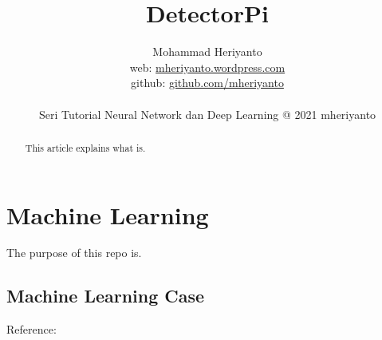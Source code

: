 \documentclass[12pt,oneside,a4paper]{article}
\begin{document}
\title{DetectorPi}
\author{Mohammad Heriyanto \\web: \href{https://mheriyanto.wordpress.com//}{mheriyanto.wordpress.com} \\ github: \href{https://github.com/mheriyanto}{github.com/mheriyanto} \\~\\ Seri Tutorial Neural Network dan Deep Learning @ 2021 mheriyanto}
   
\maketitle

\begin{abstract}
This article explains what is.
\end{abstract}

\section{Machine Learning}
The purpose of this repo is.

\subsection{Machine Learning Case}

Reference: 
\end{document}
